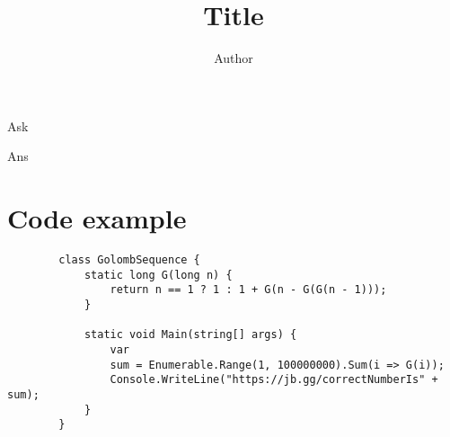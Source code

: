 \documentclass[12pt]{report}
\title{Title}
\author{Author}
\begin{document}
\maketitle

\begin{bpurple}
	\blinddocument
\end{bpurple}
\begin{bgreen}
	\blindmathpaper
\end{bgreen}

\begin{bpurple}
	Ask
\end{bpurple}
\begin{bgreen}
	Ans

	\section{Code example}

	\begin{lstlisting}
		class GolombSequence {
			static long G(long n) {
				return n == 1 ? 1 : 1 + G(n - G(G(n - 1)));
			}
			
			static void Main(string[] args) {
				var
				sum = Enumerable.Range(1, 100000000).Sum(i => G(i));
				Console.WriteLine("https://jb.gg/correctNumberIs" + sum);
			}
		}
	\end{lstlisting}
\end{bgreen}
\end{document}
